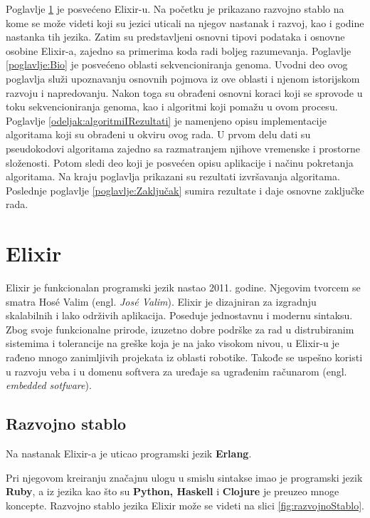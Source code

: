 \documentclass[12pt,oneside]{memoir}
\begin{document}
Poglavlje \ref{poglavlje:prvoPoglavlje} je posvećeno Elixir-u. Na početku je prikazano razvojno stablo na kome se može videti koji su jezici uticali na njegov nastanak i razvoj, kao i godine nastanka tih jezika. Zatim su predstavljeni osnovni tipovi podataka i osnovne osobine Elixir-a, zajedno sa primerima koda radi boljeg razumevanja. Poglavlje \ref{poglavlje:Bio} je posvećeno oblasti sekvencioniranja genoma. Uvodni deo ovog poglavlja služi upoznavanju osnovnih pojmova iz ove oblasti i njenom istorijskom razvoju i napredovanju. Nakon toga su obrađeni osnovni koraci koji se sprovode u toku sekvencioniranja genoma, kao i algoritmi koji pomažu u ovom procesu. Poglavlje \ref{odeljak:algoritmiIRezultati} je namenjeno opisu implementacije algoritama koji su obrađeni u okviru ovog rada. U prvom delu dati su pseudokodovi algoritama zajedno sa razmatranjem njihove vremenske i prostorne složenosti. Potom sledi deo koji je posvećen opisu aplikacije i načinu pokretanja algoritama. Na kraju poglavlja prikazani su rezultati izvršavanja algoritama. Poslednje poglavlje \ref{poglavlje:Zaključak} sumira rezultate i daje osnovne zaključke rada.

\chapter{Elixir} %
\label{poglavlje:prvoPoglavlje}

Elixir je funkcionalan programski jezik nastao 2011. godine. Njegovim tvorcem se smatra Hosé Valim (engl. \textit{José Valim}). Elixir je dizajniran za izgradnju skalabilnih i lako održivih aplikacija. Poseduje jednostavnu i modernu sintaksu. Zbog svoje funkcionalne prirode, izuzetno dobre podrške za rad u distrubiranim sistemima i tolerancije na greške koja je na jako visokom nivou, u Elixir-u je rađeno mnogo zanimljivih projekata iz oblasti robotike. Takođe se uspešno koristi u razvoju veba i u domenu softvera za uređaje sa ugrađenim računarom (engl. \textit{embedded sotfware}).



\section{Razvojno stablo}

Na nastanak Elixir-a je uticao programski jezik \textbf{Erlang}. 
\begin{comment}Elixir radi uz podršku virtualne mašine ovog jezika koja je karakteristična po minimalnom kašnjenju i zavidnoj toleranciji na greške. 
\end{comment}
Pri njegovom kreiranju značajnu ulogu u smislu sintakse imao je programski jezik \textbf{Ruby}, a iz jezika kao što su \textbf{Python, Haskell} i \textbf{Clojure} je preuzeo mnoge koncepte. Razvojno stablo jezika Elixir može se videti na slici \ref{fig:razvojnoStablo}. 
\begin{comment}
U Elixir-u ne postoje objekti i klase, već se sve zasniva na funkcijama i rekurziji. (izmeni) 
\end{comment}
\end{document}
